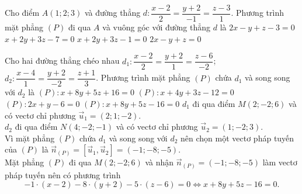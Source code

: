 \begin{ex}
	Cho điểm $A(1;2;3)$ và đường thẳng $d\colon\dfrac{x-2}{2}=\dfrac{y+2}{-1}=\dfrac{z-3}{1}$. Phương trình mặt phẳng $(P)$ đi qua $A$ và vuông góc với đường thẳng $d$ là
	\choice
	{\True $2x-y+z-3=0$}
	{$x+2y+3z-7=0$}
	{$x+2y+3z-1=0$}
	{$2x-y+z=0$}
\end{ex}

\begin{ex}%
	Cho hai đường thẳng chéo nhau  $d_1:\dfrac{x-2}{2}=\dfrac{y+2}{1}=\dfrac{z-6}{-2}$; $d_2:\dfrac{x-4}{1}=\dfrac{y+2}{-2}=\dfrac{z+1}{3}$. Phương trình mặt phẳng $(P)$ chứa $d_1$ và song song với $d_2$ là
	\choice
	{$(P):x+8y+5z+16=0$}
	{$(P):x+4y+3z-12=0$}
	{$(P):2x+y-6=0$}
	{\True $(P):x+8y+5z-16=0$}
	\loigiai
	{
		$d_1$ đi qua điểm $M(2;-2;6)$ và có vectơ chỉ phương $\vec{u}_1=(2;1;-2).$ \\
		$d_2$ đi qua điểm $N(4;-2;-1)$ và có vectơ chỉ phương $\vec{u}_2=(1;-2;3)$.\\
		Vì mặt phẳng $(P)$ chứa $d_1$ và song song với $d_2$ nên chọn một vectơ pháp tuyến của $(P)$ là $ \vec{n}_{(P)}=\left[\vec{u}_1,\vec{u}_2\right]=(-1;-8;-5)$.\\
		Mặt phẳng $(P)$ đi qua $M(2;-2;6)$ và nhận $\vec{n}_{(P)}=(-1;-8;-5)$ làm vectơ pháp tuyến nên có phương trình $$-1\cdot(x-2)-8\cdot(y+2)-5\cdot(z-6)=0  \Leftrightarrow x+8y+5z-16=0.$$
	}
\end{ex}

